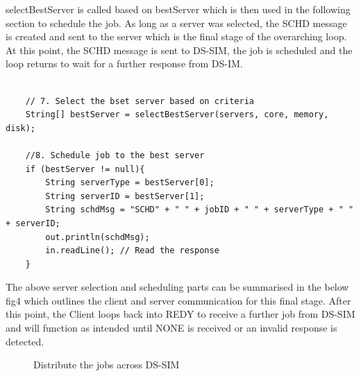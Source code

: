 selectBestServer is called based on bestServer which is then used in the following section to schedule the job. As long as a server was selected, the SCHD message is created and sent to the server which is the final stage of the overarching loop. At this point, the SCHD message is sent to DS-SIM, the job is scheduled and the loop returns to wait for a further response from DS-IM.
\begin{lstlisting}

    // 7. Select the bset server based on criteria
    String[] bestServer = selectBestServer(servers, core, memory, disk);

    //8. Schedule job to the best server
    if (bestServer != null){
        String serverType = bestServer[0];
        String serverID = bestServer[1];
        String schdMsg = "SCHD" + " " + jobID + " " + serverType + " " + serverID;
        out.println(schdMsg);
        in.readLine(); // Read the response
    }
\end{lstlisting}

The above server selection and scheduling parts can be summarised in the below fig4 which outlines the client and server communication for this final stage. After this point, the Client loops back into REDY to receive a further job from DS-SIM and will function as intended until NONE is received or an invalid response is detected.

\begin{figure}[h]
    \centering
    \caption{Distribute the jobs across DS-SIM}
    \label{fig:communication}
\end{figure}
